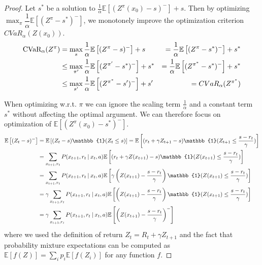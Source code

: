 \begin{proof}

Let $s^*$ be a solution to $\frac{1}{\alpha}\mathbb{E}\left[ (Z^\pi(x_0)-s)^-\right] + s$. Then by optimizing $\max_\pi \dfrac{1}{\alpha}\mathbb{E}
\left[ (Z^\pi-s^*)^-\right]$, we monotonely improve the optimization criterion $CVaR_\alpha(Z(x_0))$.
\begin{align*}
\text{CVaR}_\alpha(Z^{\pi}) &= \max_{s}\dfrac{1}{\alpha}\mathbb{E}\left[ (Z^{\pi}-s)^-\right] + s &= \dfrac{1}{\alpha}\mathbb{E}\left[ (Z^{\pi}-s^*)^-\right] + s^* \\
&\le \max_{\pi'}\dfrac{1}{\alpha}\mathbb{E} \left[ (Z^{\pi'}-s^*)^-\right] + s^* &= \dfrac{1}{\alpha}\mathbb{E}\left[ (Z^{\pi^*}-s^*)^-\right] + s^*\\
 &\le \max_{s'}\dfrac{1}{\alpha}\mathbb{E}\left[ (Z^{\pi^*}-s')^-\right] + s' &= CVaR_\alpha(Z^{\pi^*})
\end{align*}

When optimizing w.r.t. $\pi$ we can ignore the scaling term $\frac{1}{\alpha}$ and a constant term $s^*$ without affecting the optimal argument. We can therefore focus on optimization of $\mathbb{E}\left[ (Z^\pi(x_0)-s^*)^-\right]$.
\begin{equation}
\begin{split}
\mathbb{E}\left[(Z_t-s)^-\right] &= \mathbb{E}\left[(Z_t-s)\mathbb{1}(Z_t\le s)\right] = \mathbb{E}\left[(r_t + \gamma Z_{t+1}-s)\mathbb{1}(Z_{t+1}\le \dfrac{s - r_t}{\gamma})\right]\\
&= \sum_{x_{t+1}, r_t} P(x_{t+1}, r_t \given x_t, a)\mathbb{E}\left[(r_t + \gamma Z(x_{t+1})-s)\mathbb{1}(Z(x_{t+1})\le \dfrac{s - r_t}{\gamma})\right]\\
&= \sum_{x_{t+1}, r_t} P(x_{t+1}, r_t \given x_t, a)\mathbb{E}\left[\gamma\left(Z(x_{t+1})-\dfrac{s-r_t}{\gamma}\right)\mathbb{1}(Z(x_{t+1})\le \dfrac{s - r_t}{\gamma})\right]\\
&= \gamma\sum_{x_{t+1}, r_t} P(x_{t+1}, r_t \given x_t, a)\mathbb{E}\left[\left(Z(x_{t+1})-\dfrac{s-r_t}{\gamma}\right)\mathbb{1}(Z(x_{t+1})\le \dfrac{s - r_t}{\gamma})\right]\\
&= \gamma\sum_{x_{t+1}, r_t} P(x_{t+1}, r_t \given x_t, a)\mathbb{E}\left[\left(Z(x_{t+1}) - \dfrac{s - r_t}{\gamma}\right)^-\right]
\end{split}
\end{equation}
where we used the definition of return $Z_t = R_t + \gamma Z_{t+1}$ and the fact that probability mixture expectations can be computed as $\mathbb{E}[f(Z)] = \sum_i p_i \mathbb{E}[f(Z_i)]$ for any function $f$.


\end{proof}
